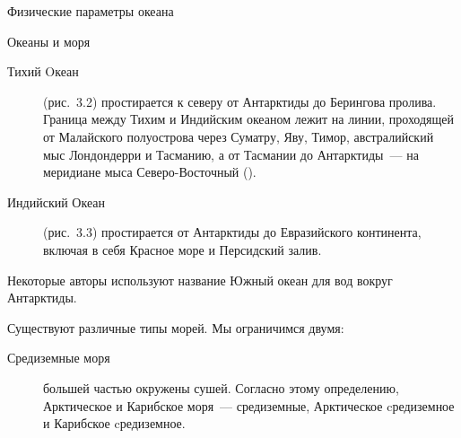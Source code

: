 \begin{chapter}{Физические параметры океана}
\begin{section}{Океаны и моря}
\begin{description}

\item[Тихий Oкеан] (рис.~3.2) простирается к северу от Антарктиды до Берингова
пролива. Граница между Тихим и Индийским океаном лежит на линии, проходящей
от Малайского полуострова через Суматру, Яву, Тимор, австралийский мыс
Лондондерри и Тасманию, а от Тасмании до Антарктиды~--- на меридиане мыса 
Северо-Восточный ().
%



\item[Индийский Океан] (рис.~3.3) простирается от Антарктиды до Евразийского
континента, включая в себя Красное море и Персидский залив. 
%

\end{description}

Некоторые авторы используют название Южный океан для вод вокруг Антарктиды.%

Существуют различные типы морей. Мы ограничимся двумя:
\begin{description}
\item[Средиземные моря] большей частью окружены сушей. Согласно этому
определению, Арктическое и Карибское моря~--- средиземные, Арктическое
cредиземное и Карибское cредиземное.
%


\end{description}
\end{section}
\end{chapter}
